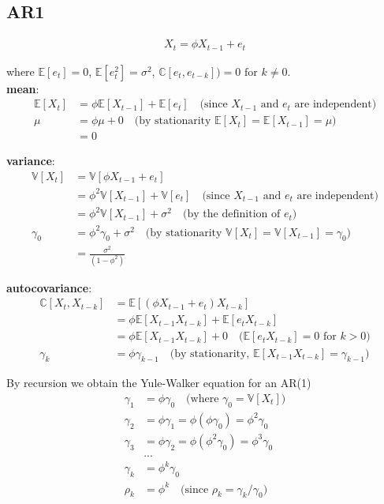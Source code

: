 \documentclass[latex/main.tex]{subfiles}
\begin{document}
\subsection*{AR1}

\begin{align}
    X_t = \phi X_{t-1} + e_t \label{eq:ar1-1}
\end{align}

where $\mathbb{E}[e_t] = 0$, $\mathbb{E}[e_t^2] = \sigma^2$, $\mathbb{C}[e_t, e_{t-k}]) = 0\text{ for }k\ne0$.\\


\textbf{mean}:
\begin{align}
    \mathbb{E}[X_t] &= \phi \mathbb{E}[X_{t-1}] + \mathbb{E}[e_t] \quad\text{(since $X_{t-1}$ and $e_t$ are independent)}\\
    \mu &= \phi \mu + 0 \quad\text{(by stationarity $\mathbb{E}[X_t] = \mathbb{E}[X_{t-1}] = \mu$)}\\
    &= 0
\end{align}


\textbf{variance}:
\begin{align}
    \mathbb{V}[X_t] &= \mathbb{V}[\phi X_{t-1} + e_t]\\
    &= \phi^2 \mathbb{V}[X_{t-1}] + \mathbb{V}[e_t] \quad \text{(since $X_{t-1}$ and $e_t$ are independent)}\\
    &= \phi^2 \mathbb{V}[X_{t-1}] + \sigma^2 \quad \text{(by the definition of $e_t$)}\\
    \gamma_0 &= \phi^2 \gamma_0 + \sigma^2 \quad \text{(by stationarity $\mathbb{V}[X_t] = \mathbb{V}[X_{t-1}] = \gamma_0$)}\\
    &= \frac{\sigma^2}{(1 - \phi^2)}
\end{align}

\textbf{autocovariance}:
\begin{align}
    \mathbb{C}[X_t,X_{t-k}] &= \mathbb{E}[(\phi X_{t-1} + e_t) X_{t-k}]\\
    &= \phi \mathbb{E}[X_{t-1}X_{t-k}] + \mathbb{E}[e_t X_{t-k}]\\
    &= \phi \mathbb{E}[X_{t-1} X_{t-k}] + 0 \quad \text{($\mathbb{E}[e_t X_{t-k}] = 0$ for $k>0$)}\\
    \gamma_k &= \phi \gamma_{k-1} \quad \text{(by stationarity, $\mathbb{E}[X_{t-1}X_{t-k}] = \gamma_{k-1}$)}
\end{align}

By recursion we obtain the Yule-Walker equation for an AR(1)
\begin{align}
    \gamma_1 &= \phi \gamma_0 \quad \text{(where $\gamma_0 = \mathbb{V}[X_t]$)}\\
    \gamma_2 &= \phi\gamma_1 = \phi(\phi\gamma_0) = \phi^2\gamma_0\\
    \gamma_3 &= \phi\gamma_2 = \phi(\phi^2\gamma_0) = \phi^3\gamma_0\\
    &...\\
    \gamma_k &= \phi^k\gamma_0\\
    \rho_k &= \phi^k \quad \text{(since $\rho_k = \gamma_k / \gamma_0$)}
\end{align}
\end{document}
